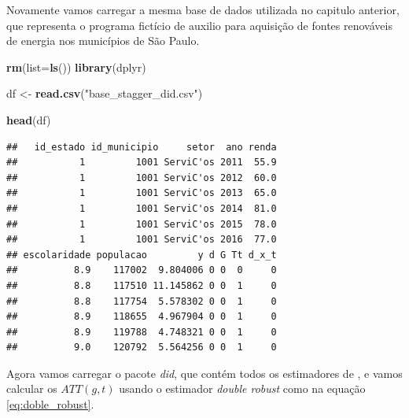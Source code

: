 \documentclass[portugues]{article}
\newenvironment{Shaded}{\begin{snugshade}}{\end{snugshade}}
\newcommand{\AttributeTok}[1]{\textcolor[rgb]{0.13,0.29,0.53}{#1}}
\newcommand{\FunctionTok}[1]{\textcolor[rgb]{0.13,0.29,0.53}{\textbf{#1}}}
\newcommand{\NormalTok}[1]{#1}
\newcommand{\OtherTok}[1]{\textcolor[rgb]{0.56,0.35,0.01}{#1}}
\newcommand{\StringTok}[1]{\textcolor[rgb]{0.31,0.60,0.02}{#1}}
\begin{document}
Novamente vamos carregar a mesma base de dados utilizada no capitulo anterior, que representa o programa fictício de auxilio para aquisição de fontes renováveis de energia nos municípios de São Paulo.

\begin{box_code}

\begin{Shaded}
\begin{Highlighting}[]
\FunctionTok{rm}\NormalTok{(}\AttributeTok{list=}\FunctionTok{ls}\NormalTok{())}
\FunctionTok{library}\NormalTok{(dplyr)}

\NormalTok{df }\OtherTok{\textless{}{-}} \FunctionTok{read.csv}\NormalTok{(}\StringTok{"base\_stagger\_did.csv"}\NormalTok{)}

\FunctionTok{head}\NormalTok{(df)}
\end{Highlighting}
\end{Shaded}

\begin{verbatim}
##   id_estado id_municipio     setor  ano renda 
##           1         1001 ServiC'os 2011  55.9          
##           1         1001 ServiC'os 2012  60.0         
##           1         1001 ServiC'os 2013  65.0          
##           1         1001 ServiC'os 2014  81.0 
##           1         1001 ServiC'os 2015  78.0
##           1         1001 ServiC'os 2016  77.0
## escolaridade populacao         y d G Tt d_x_t
##          8.9    117002  9.804006 0 0  0     0
##          8.8    117510 11.145862 0 0  1     0
##          8.8    117754  5.578302 0 0  1     0
##          8.9    118655  4.967904 0 0  1     0
##          8.9    119788  4.748321 0 0  1     0
##          9.0    120792  5.564256 0 0  1     0

\end{verbatim}

\end{box_code}

Agora vamos carregar o pacote \textit{did}, que contém todos os estimadores de \cite{callaway2021difference}, e vamos calcular os $ATT(g,t)$ usando o estimador \textit{double robust} como na equação \eqref{eq:doble_robust}.
\end{document}
